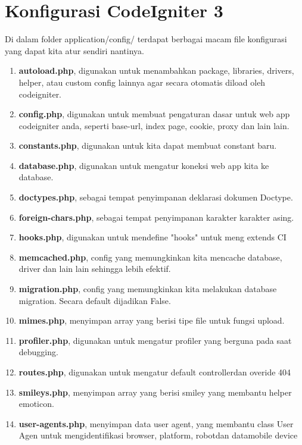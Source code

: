 \section{Konfigurasi CodeIgniter 3}
Di dalam folder application/config/ terdapat berbagai macam file konfigurasi yang dapat kita atur sendiri nantinya.
\begin{enumerate}
    \item \textbf{autoload.php}, digunakan untuk menambahkan package, libraries, drivers, helper, atau custom config lainnya agar secara otomatis diload oleh codeigniter.
    \item \textbf{config.php}, digunakan untuk membuat pengaturan dasar untuk web app codeigniter anda, seperti base-url, index page, cookie, proxy dan lain lain.
    \item \textbf{constants.php}, digunakan untuk kita dapat membuat constant baru.
    \item \textbf{database.php}, digunakan untuk mengatur koneksi web app kita ke database.
    \item \textbf{doctypes.php}, sebagai tempat penyimpanan deklarasi dokumen Doctype.
    \item \textbf{foreign-chars.php}, sebagai tempat penyimpanan karakter karakter asing.
    \item \textbf{hooks.php}, digunakan untuk mendefine "hooks" untuk meng extends CI
    \item \textbf{memcached.php}, config yang memungkinkan kita mencache database, driver dan lain lain sehingga lebih efektif.
    \item \textbf{migration.php}, config yang memungkinkan kita melakukan database migration. Secara default dijadikan False.
    \item \textbf{mimes.php}, menyimpan array yang berisi tipe file untuk fungsi upload.
    \item \textbf{profiler.php}, digunakan untuk mengatur profiler yang berguna pada saat debugging.
    \item \textbf{routes.php}, digunakan untuk mengatur default controllerdan overide 404
    \item \textbf{smileys.php}, menyimpan array yang berisi smiley yang membantu helper emoticon.
    \item \textbf{user-agents.php}, menyimpan data user agent, yang membantu class User Agen untuk mengidentifikasi browser, platform, robotdan datamobile device
\end{enumerate}


